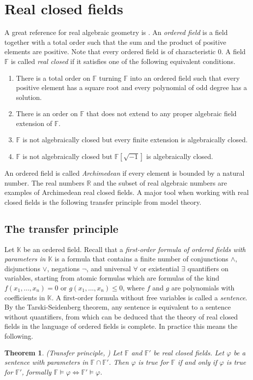 \documentclass[12pt]{amsart}
\newcommand{\F}{\mathbb{F} }
\newcommand{\R}{\mathbb{R} }
\newcommand{\K}{\mathbb{K}}
\numberwithin{equation}{section}
\newtheorem{theorem}{Theorem}[section]
\theoremstyle{remark} %
\begin{document}
	\section{Real closed fields}\label{sec:real_closed}
	A great reference for real algebraic geometry is \cite{BCR}. An \emph{ordered field} is a field together with a total order such that the sum and the product of positive elements are positive. Note that every ordered field is of characteristic $0$.
	A field $\F$ is called \emph{real closed} if it satisfies one of the following equivalent conditions.
	\begin{enumerate}
		\item [(1)] There is a total order on $\F$ turning $\F$ into an ordered field such that every positive element has a square root and every polynomial of odd degree has a solution.
		\item [(2)] There is an order on $\F$ that does not extend to any proper algebraic field extension of $\F$.
		\item [(3)] $\F$ is not algebraically closed but every finite extension is algebraically closed.
		\item [(4)] $\F$ is not algebraically closed but $\F[\sqrt{-1}]$ is algebraically closed.
	\end{enumerate}
	An ordered field is called \emph{Archimedean} if every element is bounded by a natural number. The real numbers $\R$ and the subset of real algebraic numbers are examples of Archimedean real closed fields.
	A major tool when working with real closed fields is the following transfer principle from model theory. 
	
	
	\subsection{The transfer principle}
	
	Let $\K$ be an ordered field. Recall that a \emph{first-order formula of ordered fields with parameters in $\K$} is a formula that contains a finite number of conjunctions $\wedge$, disjunctions $\lor$, negations $\lnot$, and universal $\forall$ or existential $\exists$ quantifiers on variables, starting from atomic formulas which are formulas of the kind $f(x_1, \ldots, x_n) = 0$ or $g(x_1, \ldots , x_n) \leq 0$, where $f$ and $g$ are polynomials with coefficients in $\K$. A first-order formula without free variables is called a \emph{sentence}. By the Tarski-Seidenberg theorem, any sentence is equivalent to a sentence without quantifiers, from which can be deduced that the theory of real closed fields in the language of ordered fields is complete. In practice this means the following. 
	\begin{theorem}\label{thm:logic} (Transfer principle, \cite{BCR})
		Let $\F$ and $\F'$ be real closed fields. Let $\varphi$ be a sentence with parameters in $\F \cap \F'$. Then $\varphi$ is true for $\F$ if and only if $\varphi$ is true for $\F'$, formally $\F \models \varphi \iff \F' \models \varphi$.
	\end{theorem}
	
\end{document}

